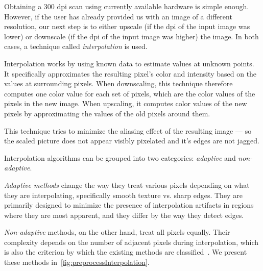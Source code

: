 Obtaining a 300 dpi scan using currently available hardware is simple enough. However, if the user has already provided us with an image of a different resolution, our next step is to either upscale (if the dpi of the input image was lower) or downscale (if the dpi of the input image was higher) the image. In both cases, a technique called \emph{interpolation} is used. 

Interpolation works by using known data to estimate values at unknown points. It specifically approximates the resulting pixel's color and intensity based on the values at surrounding pixels. When downscaling, this technique therefore computes one color value for each set of pixels, which are the color values of the pixels in the new image. When upscaling, it computes color values of the new pixels by approximating the values of the old pixels around them.

This technique tries to minimize the aliasing effect of the resulting image --- so the scaled picture does not appear visibly pixelated and it's edges are not jagged.

Interpolation algorithms can be grouped into two categories: \emph{adaptive} and \emph{non-adaptive}.

\emph{Adaptive methods} change the way they treat various pixels depending on what they are interpolating, specifically smooth texture vs. sharp edges. They are primarily designed to minimize the presence of interpolation artifacts in regions where they are most apparent, and they differ by the way they detect edges.

\emph{Non-adaptive} methods, on the other hand, treat all pixels equally. Their complexity depends on the number of adjacent pixels during interpolation, which is also the criterion by which the existing methods are classified~\cite{interpolation}. We present these methods in~\cref{fig:preprocessInterpolation}.

